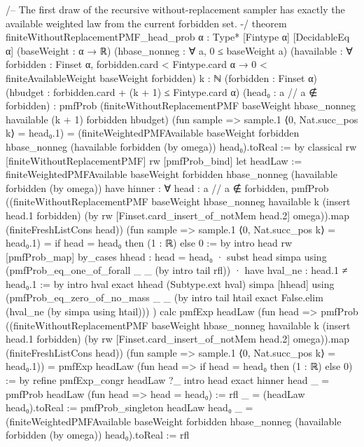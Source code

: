 \documentclass[10pt]{article}
\begin{document}
\begin{ReviewVerbatim}
/--
The first draw of the recursive without-replacement sampler has exactly the
available weighted law from the current forbidden set.
-/
theorem finiteWithoutReplacementPMF_head_prob
    {α : Type*} [Fintype α] [DecidableEq α]
    (baseWeight : α → ℝ)
    (hbase_nonneg : ∀ a, 0 ≤ baseWeight a)
    (havailable : ∀ forbidden : Finset α,
      forbidden.card < Fintype.card α →
        0 < finiteAvailableWeight baseWeight forbidden)
    {k : ℕ} (forbidden : Finset α)
    (hbudget : forbidden.card + (k + 1) ≤ Fintype.card α)
    (head₀ : {a // a ∉ forbidden}) :
    pmfProb
        (finiteWithoutReplacementPMF
          baseWeight hbase_nonneg havailable
          (k + 1) forbidden hbudget)
        (fun sample =>
          sample.1 ⟨0, Nat.succ_pos k⟩ = head₀.1) =
      (finiteWeightedPMFAvailable
        baseWeight forbidden hbase_nonneg
        (havailable forbidden (by omega)) head₀).toReal := by
  classical
  rw [finiteWithoutReplacementPMF]
  rw [pmfProb_bind]
  let headLaw :=
    finiteWeightedPMFAvailable
      baseWeight forbidden hbase_nonneg
      (havailable forbidden (by omega))
  have hinner : ∀ head : {a // a ∉ forbidden},
      pmfProb
          ((finiteWithoutReplacementPMF
            baseWeight hbase_nonneg havailable
            k (insert head.1 forbidden)
            (by
              rw [Finset.card_insert_of_notMem head.2]
              omega)).map (finiteFreshListCons head))
          (fun sample =>
            sample.1 ⟨0, Nat.succ_pos k⟩ = head₀.1) =
        if head = head₀ then (1 : ℝ) else 0 := by
    intro head
    rw [pmfProb_map]
    by_cases hhead : head = head₀
    · subst head
      simpa using
        (pmfProb_eq_one_of_forall _ _ (by
          intro tail
          rfl))
    · have hval_ne : head.1 ≠ head₀.1 := by
        intro hval
        exact hhead (Subtype.ext hval)
      simpa [hhead] using
        (pmfProb_eq_zero_of_no_mass _ _ (by
        intro tail htail
        exact False.elim (hval_ne (by simpa using htail)))
        )
  calc
    pmfExp headLaw
        (fun head =>
          pmfProb
            ((finiteWithoutReplacementPMF
              baseWeight hbase_nonneg havailable
              k (insert head.1 forbidden)
              (by
                rw [Finset.card_insert_of_notMem head.2]
                omega)).map (finiteFreshListCons head))
            (fun sample =>
              sample.1 ⟨0, Nat.succ_pos k⟩ = head₀.1))
        = pmfExp headLaw (fun head => if head = head₀ then (1 : ℝ) else 0) := by
            refine pmfExp_congr headLaw ?_
            intro head
            exact hinner head
    _ = pmfProb headLaw (fun head => head = head₀) := rfl
    _ = (headLaw head₀).toReal := pmfProb_singleton headLaw head₀
    _ = (finiteWeightedPMFAvailable
        baseWeight forbidden hbase_nonneg
        (havailable forbidden (by omega)) head₀).toReal := rfl
\end{ReviewVerbatim}
\end{document}
